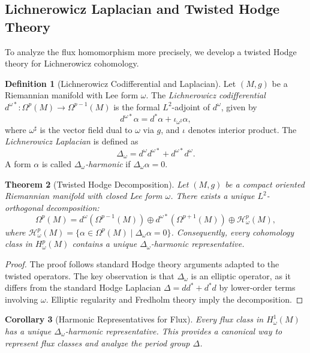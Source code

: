 \documentclass[11pt,a4paper]{amsart}
\newtheorem{theorem}{Theorem}[section]
\newtheorem{corollary}[theorem]{Corollary}
\theoremstyle{definition}
\newtheorem{definition}[theorem]{Definition}
\theoremstyle{remark}
\newcommand{\domega}{d^\omega}
\newcommand{\domegastar}{d^{\omega*}}
\begin{document}
	\subsection{Lichnerowicz Laplacian and Twisted Hodge Theory}
	
	To analyze the flux homomorphism more precisely, we develop a twisted Hodge theory for Lichnerowicz cohomology.
	
	\begin{definition}[Lichnerowicz Codifferential and Laplacian]
		Let $(M,g)$ be a Riemannian manifold with Lee form $\omega$. The \emph{Lichnerowicz codifferential} $\domegastar : \Omega^p(M) \to \Omega^{p-1}(M)$ is the formal $L^2$-adjoint of $\domega$, given by
		\[
		\domegastar \alpha = d^* \alpha + \iota_{\omega^\sharp} \alpha,
		\]
		where $\omega^\sharp$ is the vector field dual to $\omega$ via $g$, and $\iota$ denotes interior product. The \emph{Lichnerowicz Laplacian} is defined as
		\[
		\Delta_\omega = \domega\domegastar + \domegastar\domega.
		\]
		A form $\alpha$ is called \emph{$\Delta_\omega$-harmonic} if $\Delta_\omega \alpha = 0$.
	\end{definition}
	
	\begin{theorem}[Twisted Hodge Decomposition]
		Let $(M,g)$ be a compact oriented Riemannian manifold with closed Lee form $\omega$. There exists a unique $L^2$-orthogonal decomposition:
		\[
		\Omega^p(M) = \domega(\Omega^{p-1}(M)) \oplus \domegastar(\Omega^{p+1}(M)) \oplus \mathcal{H}_\omega^p(M),
		\]
		where $\mathcal{H}_\omega^p(M) = \{ \alpha \in \Omega^p(M) \mid \Delta_\omega \alpha = 0 \}$. Consequently, every cohomology class in $H_\omega^p(M)$ contains a unique $\Delta_\omega$-harmonic representative.
	\end{theorem}
	
	\begin{proof}
		The proof follows standard Hodge theory arguments adapted to the twisted operators. The key observation is that $\Delta_\omega$ is an elliptic operator, as it differs from the standard Hodge Laplacian $\Delta = dd^* + d^*d$ by lower-order terms involving $\omega$. Elliptic regularity and Fredholm theory imply the decomposition.
	\end{proof}
	
	\begin{corollary}[Harmonic Representatives for Flux]
		Every flux class in $H_\omega^1(M)$ has a unique $\Delta_\omega$-harmonic representative. This provides a canonical way to represent flux classes and analyze the period group $\Delta$.
	\end{corollary}
	
\end{document}
